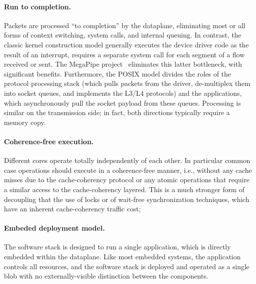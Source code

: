 \paragraph{Run to completion.}  Packets are processed ``to
completion'' by the dataplane, eliminating most or all forms of
context switching, system calls, and internal queuing.  In contrast,
the classic kernel construction model generally executes the device
driver code as the result of an interrupt, requires a separate system
call for each segment of a flow received or sent.  The MegaPipe
project~\cite{han2012megapipe} eliminates this latter bottleneck, with
significant benefits.  Furthermore, the POSIX model divides the roles
of the protocol processing stack (which pulls packets from the driver,
de-multiplex them into socket queues, and implements the L3/L4
protocols) and the applications, which asynchronously pull the socket
payload from these queues.  Processing is similar on the transmission
side; in fact, both directions typically require a memory copy.

\paragraph{Coherence-free execution.} 
Different cores operate totally independently
of each other.  In particular common case operations should execute in
a coherence-free manner, i.e., without any cache misses due to the
cache-coherency protocol or any atomic operations that require a
similar access to the cache-coherency layered. This is a much stronger
form of decoupling that the use of locks or of wait-free
synchronization techniques, which have an inherent cache-coherency
traffic cost; 

\paragraph{Embeded deployment model.} 

The software stack is designed to run a single
application, which is directly embedded within the dataplane.  Like
most embedded systems, the application controls all resources, and the
software stack is deployed and operated as a single blob with no
externally-visible distinction between the components.








